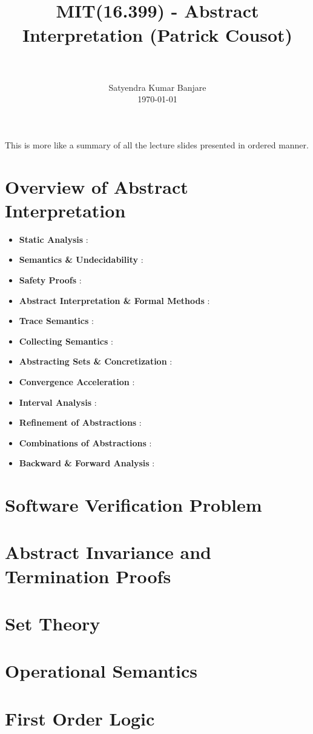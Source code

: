 \documentclass[paper=a4, fontsize=11pt]{scrartcl}
\title{
		\usefont{OT1}{bch}{b}{n}
		\horrule{0.5pt} \\[0.4cm]
		\normalsize MIT(16.399) - Abstract Interpretation (Patrick Cousot) \\
		\horrule{2pt} \\[0.5cm]
}
\author{
		\normalfont 								\normalsize
        Satyendra Kumar Banjare\\[-3pt]		\normalsize
        \today
}
\date{}
\numberwithin{equation}{section}		%
\numberwithin{figure}{section}			%
\numberwithin{table}{section}				%
\begin{document}
\maketitle

This is more like a summary of all the lecture slides presented in ordered manner.

\section{Overview of Abstract Interpretation}
\begin{itemize}
	\item{\textbf{Static Analysis} : 
	}
	\item{\textbf{Semantics \& Undecidability} : 
	}
	\item{\textbf{Safety Proofs} : 
	}
	\item{\textbf{Abstract Interpretation \& Formal Methods} : 
	}
	\item{\textbf{Trace Semantics} : 
	}
	\item{\textbf{Collecting Semantics} : 
	}
	\item{\textbf{Abstracting Sets \& Concretization} : 
	}
	\item{\textbf{Convergence Acceleration} : 
	}
	\item{\textbf{Interval Analysis} : 
	}
	\item{\textbf{Refinement of Abstractions} : 
	}
	\item{\textbf{Combinations of Abstractions} : 
	}
	\item{\textbf{Backward \& Forward Analysis} : 
	}
\end{itemize}

\section{Software Verification Problem}
\section{Abstract Invariance and Termination Proofs}
\section{Set Theory}
\section{Operational Semantics}
\section{First Order Logic}
\end{document}
